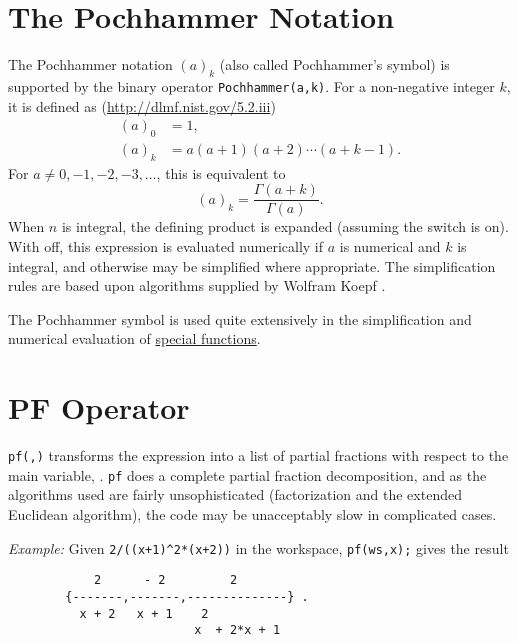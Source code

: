 \section{The Pochhammer Notation}
\hypertarget{POCH}{}
\hypertarget{operator:POCHHAMMER}{}
The Pochhammer notation $(a)_k$ (also called Pochhammer's symbol) is supported
by the binary operator \texttt{Pochhammer(a,k)}.
For a non-negative integer $k$, it is defined as
(\url{http://dlmf.nist.gov/5.2.iii})
\begin{align*}
  (a)_0 &= 1, \\
  (a)_k &= a(a+1)(a+2)\cdots(a+k-1).
\end{align*}
For $a \neq 0, -1, -2, -3, \ldots$, this is equivalent to
\[ (a)_k = \frac{\Gamma(a+k)}{\Gamma(a)}. \]
When $n$ is integral, the defining product is expanded (assuming the switch
 is on). With  off, this expression is evaluated
numerically if $a$ is numerical and $k$ is integral, and otherwise may be
simplified where appropriate.  The simplification rules are based upon
algorithms supplied by Wolfram Koepf \cite{Koepf:92}.

The Pochhammer symbol is used quite extensively in the simplification and
numerical evaluation of \hyperlink{SPECFNS}{special functions}.

\section{PF Operator}
\hypertarget{operator:PF}{}

\texttt{pf(,)} transforms the expression  into
a list of partial fractions with respect to the main variable, .
\texttt{pf}
does a complete partial fraction decomposition, and as the algorithms used
are fairly unsophisticated (factorization and the extended Euclidean
algorithm), the code may be unacceptably slow in complicated cases.

\textit{Example:}
Given \texttt{2/((x+1)\textasciicircum2*(x+2))} in the workspace,
\texttt{pf(ws,x);} gives the result
\begin{samepage}
\begin{verbatim}
            2      - 2         2
        {-------,-------,--------------} .
          x + 2   x + 1    2
                          x  + 2*x + 1
\end{verbatim}
\end{samepage}

